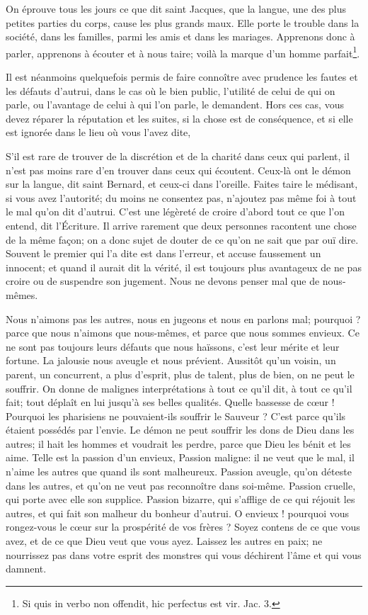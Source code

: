 \documentclass[instructions.tex]{subfiles}
\begin{document}
On éprouve tous les jours ce que dit saint Jacques, que la langue, une des plus petites parties du corps, cause les plus grands maux. Elle porte le trouble dans la société, dans les familles, parmi les amis et dans les mariages. Apprenons donc à parler, apprenons à écouter et à nous taire; voilà la marque d’un homme parfait\footnote{Si quis in verbo non offendit, hic perfectus est vir. Jac. 3.}.
 
Il est néanmoins quelquefois permis de faire connoître avec prudence les fautes et les défauts d’autrui, dans le cas où le bien public, l’utilité de celui de qui on parle, ou l’avantage de celui à qui l’on parle, le demandent. Hors ces cas, vous devez réparer la réputation et les suites, si la chose est de conséquence, et si elle est ignorée dans le lieu où vous l’avez dite,
 
S’il est rare de trouver de la discrétion et de la charité dans ceux qui parlent, il n’est pas moins rare d’en trouver dans ceux qui écoutent. Ceux-là ont le démon sur la langue, dit saint Bernard, et ceux-ci dans l’oreille. Faites taire le médisant, si vous avez l’autorité; du moins ne consentez pas, n’ajoutez pas même foi à tout le mal qu’on dit d’autrui. C’est une légèreté de croire d’abord tout ce que l’on entend, dit l’Écriture. Il arrive rarement que deux personnes racontent une chose de la même façon; on a donc sujet de douter de ce qu’on ne sait que par ouï dire. Souvent le premier qui l’a dite est dans l’erreur, et accuse faussement un innocent; et quand il aurait dit la vérité, il est toujours plus avantageux de ne pas croire ou de suspendre son jugement. Nous ne devons penser mal que de nous-mêmes.
 
\secundo Nous n’aimons pas les autres, nous en jugeons et nous en parlons mal; pourquoi ? parce que nous n’aimons que nous-mêmes, et parce que nous sommes envieux. Ce ne sont pas toujours leurs défauts que nous haïssons, c’est leur mérite et leur fortune. La jalousie nous aveugle et nous prévient. Aussitôt qu’un voisin, un parent, un concurrent, a plus d’esprit, plus de talent, plus de bien, on ne peut le souffrir. On donne de malignes interprétations à tout ce qu’il dit, à tout ce qu’il fait; tout déplaît en lui jusqu’à ses belles qualités. Quelle bassesse de cœur ! Pourquoi les pharisiens ne pouvaient-ils souffrir le Sauveur ? C’est parce qu’ils étaient possédés par l’envie. Le démon ne peut souffrir les dons de Dieu dans les autres; il hait les hommes et voudrait les perdre, parce que Dieu les bénit et les aime. Telle est la passion d’un envieux, Passion maligne: il ne veut que le mal, il n’aime les autres que quand ils sont malheureux. Passion aveugle, qu’on déteste dans les autres, et qu’on ne veut pas reconnoître dans soi-même. Passion cruelle, qui porte avec elle son supplice. Passion bizarre, qui s’afflige de ce qui réjouit les autres, et qui fait son malheur du bonheur d’autrui. O envieux ! pourquoi vous rongez-vous le cœur sur la prospérité de vos frères ? Soyez contens de ce que vous avez, et de ce que Dieu veut que vous ayez. Laissez les autres en paix; ne nourrissez pas dans votre esprit des monstres qui vous déchirent l’âme et qui vous damnent.
 
\end{document}
